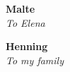 \cleardoublepage\newpage\thispagestyle{empty}\null
\cleardoublepage\newpage

\thispagestyle{empty}

\hspace{0pt}
\vfill

\begin{center}
\large

\textbf{Malte}\\
\medskip
\textit{To Elena}

\vspace*{2cm}

\textbf{Henning}\\
\medskip
\textit{To my family}


\end{center} 

\vfill
\hspace{0pt}
\vfill
\hspace{0pt}

\setlength{\abovedisplayskip}{-5pt}
\setlength{\abovedisplayshortskip}{-5pt}

\cleardoublepage
